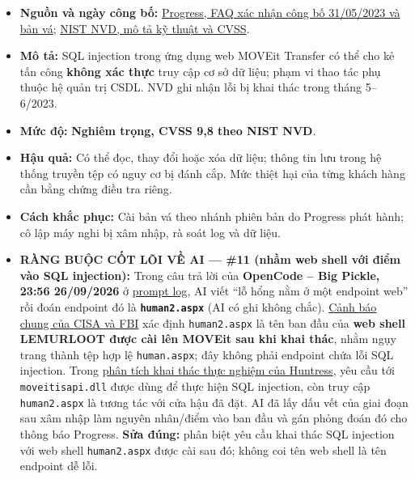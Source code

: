 \begin{itemize}
\tightlist
\item
  \textbf{Nguồn và ngày công bố:} \href{https://www.progress.com/docs/default-source/moveit-docs/moveit-transfer_moveit-cloud-vulnerabilities-customer-faq_posted.pdf?sfvrsn=16a47a99_13}{Progress, FAQ xác nhận công bố 31/05/2023 và bản vá}; \href{https://nvd.nist.gov/vuln/detail/CVE-2023-34362}{NIST NVD, mô tả kỹ thuật và CVSS}.
\item
  \textbf{Mô tả:} SQL injection trong ứng dụng web MOVEit Transfer có thể cho kẻ tấn công \textbf{không xác thực} truy cập cơ sở dữ liệu; phạm vi thao tác phụ thuộc hệ quản trị CSDL. NVD ghi nhận lỗi bị khai thác trong tháng 5--6/2023.
\item
  \textbf{Mức độ:} \textbf{Nghiêm trọng, CVSS 9,8 theo NIST NVD}.
\item
  \textbf{Hậu quả:} Có thể đọc, thay đổi hoặc xóa dữ liệu; thông tin lưu trong hệ thống truyền tệp có nguy cơ bị đánh cắp. Mức thiệt hại của từng khách hàng cần bằng chứng điều tra riêng.
\item
  \textbf{Cách khắc phục:} Cài bản vá theo nhánh phiên bản do Progress phát hành; cô lập máy nghi bị xâm nhập, rà soát log và dữ liệu.
\item
  \textbf{RÀNG BUỘC CỐT LÕI VỀ AI --- \#11 (nhầm web shell với điểm vào SQL injection):} Trong câu trả lời của \textbf{OpenCode -- Big Pickle, 23:56 26/09/2026} ở \href{Appendix_A_Prompt_Log.md}{prompt log}, AI viết ``lỗ hổng nằm ở một endpoint web'' rồi đoán endpoint đó là \textbf{\texttt{human2.aspx}} (AI có ghi không chắc). \href{https://content.govdelivery.com/accounts/USDHSCISA/bulletins/35ecb08}{Cảnh báo chung của CISA và FBI} xác định \texttt{human2.aspx} là tên ban đầu của \textbf{web shell LEMURLOOT được cài lên MOVEit sau khi khai thác}, nhằm ngụy trang thành tệp hợp lệ \texttt{human.aspx}; đây không phải endpoint chứa lỗi SQL injection. Trong \href{https://www.huntress.com/blog/moveit-transfer-critical-vulnerability-rapid-response}{phân tích khai thác thực nghiệm của Huntress}, yêu cầu tới \texttt{moveitisapi.dll} được dùng để thực hiện SQL injection, còn truy cập \texttt{human2.aspx} là tương tác với cửa hậu đã đặt. AI đã lấy dấu vết của giai đoạn sau xâm nhập làm nguyên nhân/điểm vào ban đầu và gán phỏng đoán đó cho thông báo Progress. \textbf{Sửa đúng:} phân biệt yêu cầu khai thác SQL injection với web shell \texttt{human2.aspx} được cài sau đó; không coi tên web shell là tên endpoint dễ lỗi.
\end{itemize}

